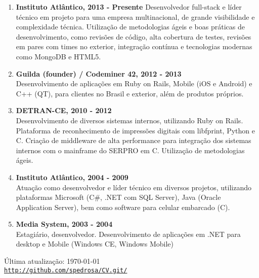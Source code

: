 \documentclass[letterpaper]{article}
\def\footerlink{http://github.com/spedrosa/CV.git/}
\begin{document}
\begin{enumerate}
  \item
  \textbf{Instituto Atlântico, 2013 - Presente}
  Desenvolvedor full-stack e líder técnico em projeto para uma empresa multinacional, de grande visibilidade e complexidade técnica. Utilização de metodologias ágeis e boas práticas de desenvolvimento, como revisões de código, alta cobertura de testes, revisões em pares com times no exterior, integração contínua e tecnologias modernas como MongoDB e HTML5.
  \item
  \textbf{Guilda (founder) / Codeminer 42, 2012 - 2013 } \\
  Desenvolvimento de aplicações em Ruby on Rails, Mobile (iOS e Android) e C++ (QT), para clientes no Brasil e exterior, além de produtos próprios.
  \item
  \textbf{DETRAN-CE, 2010 - 2012} \\
  Desenvolvimento de diversos sistemas internos, utilizando Ruby on Rails. Plataforma de reconhecimento de impressões digitais com libfprint, Python e C. Criação de middleware de alta performance para integração dos sistemas internos com o mainframe do SERPRO em C. Utilização de metodologias ágeis.
  \item
  \textbf{Instituto Atlântico, 2004 - 2009 } \\
  Atuação como desenvolvedor e líder técnico em diversos projetos, utilizando plataformas Microsoft (C\#, .NET com SQL Server), Java (Oracle Application Server), bem como software para celular embarcado (C).
  \item
  \textbf{Media System, 2003 - 2004} \\
  Estagiário, desenvolvedor. Desenvolvimento de aplicações em .NET para desktop e Mobile (Windows CE, Windows Mobile)
\end{enumerate}

\bigskip

\begin{center}
  \begin{footnotesize}
    Última atualização: \today \\
    \href{\footerlink}{\texttt{\footerlink}}
  \end{footnotesize}
\end{center}
\end{document}
